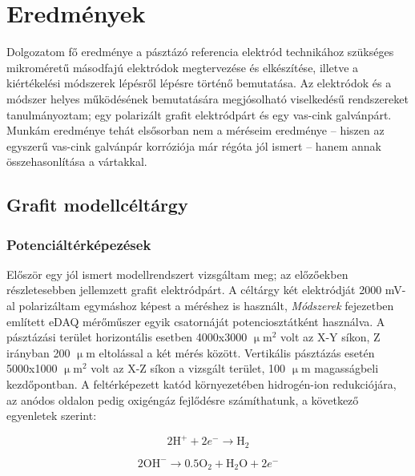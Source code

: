 \chapter{Eredmények}
\pagestyle{headings}

Dolgozatom fő eredménye a pásztázó referencia elektród technikához szükséges mikroméretű másodfajú elektródok megtervezése és elkészítése, illetve a kiértékelési módszerek lépésről lépésre történő bemutatása. Az elektródok és a módszer helyes működésének bemutatására megjósolható viselkedésű rendszereket tanulmányoztam; egy polarizált grafit elektródpárt és egy vas-cink galvánpárt. Munkám eredménye tehát elsősorban nem a méréseim eredménye -- hiszen az egyszerű vas-cink galvánpár korróziója már régóta jól ismert -- hanem annak összehasonlítása a vártakkal.

\section{Grafit modellcéltárgy}
\subsection{Potenciáltérképezések}

Először egy jól ismert modellrendszert vizsgáltam meg; az előzőekben részletesebben jellemzett grafit elektródpárt. A céltárgy két elektródját 2000 mV-al polarizáltam egymáshoz képest a méréshez is használt, \emph{Módszerek} fejezetben említett eDAQ mérőműszer egyik csatornáját potenciosztátként használva. A pásztázási terület horizontális esetben 4000x3000 $\upmu$m$^2$ volt az X-Y síkon, Z irányban 200 $\upmu$m eltolással a két mérés között. Vertikális pásztázás esetén 5000x1000 $\upmu$m$^2$ volt az X-Z síkon a vizsgált terület, 100 $\upmu$m magasságbeli kezdőpontban. A feltérképezett katód környezetében hidrogén-ion redukciójára, az anódos oldalon pedig oxigéngáz fejlődésre számíthatunk, a következő egyenletek szerint:

\begin{equation}
2\textrm{H}^+ + 2e^- \longrightarrow \textrm{H}_2
\label{grafit_katod}
\end{equation}

\begin{equation}
2\textrm{OH}^- \longrightarrow 0.5 \textrm{O}_2 + \textrm{H}_2\textrm{O} + 2e^-
\label{grafit_anod}
\end{equation}

